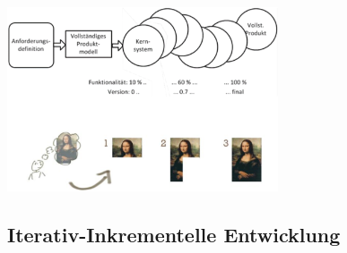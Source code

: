 \documentclass[11pt, a4paper]{article}
\begin{document}
\centering \includegraphics[width=0.6\textwidth]{Vorgehen-05.png} 

\raggedright


\subsection{Iterativ-Inkrementelle Entwicklung }
\end{document}
